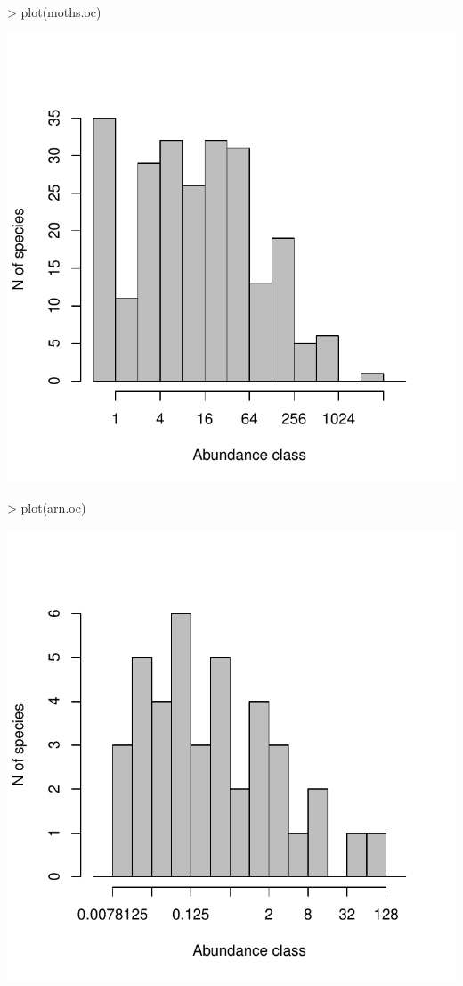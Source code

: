 \documentclass[11pt, A4]{article}
\begin{document}
{\centering
\begin{Schunk}
\begin{Sinput}
> plot(moths.oc)
\end{Sinput}
\end{Schunk}
\includegraphics{sads_intro-woven-Ploting-octaves}
}

{\centering
\begin{Schunk}
\begin{Sinput}
> plot(arn.oc)
\end{Sinput}
\end{Schunk}
\includegraphics{sads_intro-woven-Biomass-octave-plot}
}
\end{document}

